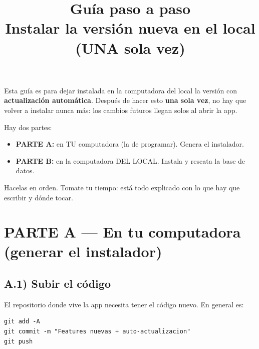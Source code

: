 \documentclass[11pt,a4paper]{article}
\title{\textbf{Guía paso a paso}\\[4pt]
\large Instalar la versión nueva en el local (UNA sola vez)}
\author{}
\date{}
\begin{document}
\maketitle
\vspace{-1.2cm}

Esta guía es para dejar instalada en la computadora del local la versión con
\textbf{actualización automática}. Después de hacer esto \textbf{una sola vez}, no hay que
volver a instalar nunca más: los cambios futuros llegan solos al abrir la app.

\begin{nota}
Hay dos partes:
\begin{itemize}[leftmargin=1.4em, itemsep=2pt, topsep=2pt]
  \item \textbf{PARTE A:} en TU computadora (la de programar). Genera el instalador.
  \item \textbf{PARTE B:} en la computadora DEL LOCAL. Instala y rescata la base de datos.
\end{itemize}
Hacelas en orden. Tomate tu tiempo: está todo explicado con lo que hay que escribir y dónde tocar.
\end{nota}

\section*{PARTE A --- En tu computadora (generar el instalador)}

\subsection*{A.1) Subir el código}
El repositorio donde vive la app necesita tener el código nuevo. En general es:

\begin{lstlisting}
git add -A
git commit -m "Features nuevas + auto-actualizacion"
git push
\end{lstlisting}
\end{document}
